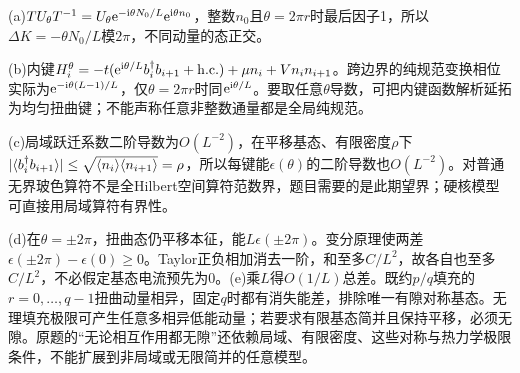 \begin{solution}
(a)$TU_\theta T^{-1}=U_\theta\mathrm e^{-\mathrm i\theta N_0/L}\mathrm e^{\mathrm i\theta n_0}$，整数$n_0$且$\theta=2\pi r$时最后因子1，所以$\Delta K=-\theta N_0/L$模$2\pi$，不同动量的态正交。

(b)内键$H_i^\theta=-t(\mathrm e^{\mathrm i\theta/L}b_i^\dagger b_{i+1}+\mathrm{h.c.})+\mu n_i+Vn_in_{i+1}$。跨边界的纯规范变换相位实际为$\mathrm e^{-\mathrm i\theta(L-1)/L}$，仅$\theta=2\pi r$时同$\mathrm e^{\mathrm i\theta/L}$。要取任意$\theta$导数，可把内键函数解析延拓为均匀扭曲键；不能声称任意非整数通量都是全局纯规范。

(c)局域跃迁系数二阶导数为$O(L^{-2})$，在平移基态、有限密度$\rho$下$|\langle b_i^\dagger b_{i+1}\rangle|\le\sqrt{\langle n_i\rangle\langle n_{i+1}\rangle}=\rho$，所以每键能$\epsilon(\theta)$的二阶导数也$O(L^{-2})$。对普通无界玻色算符不是全Hilbert空间算符范数界，题目需要的是此期望界；硬核模型可直接用局域算符有界性。

(d)在$\theta=\pm2\pi$，扭曲态仍平移本征，能$L\epsilon(\pm2\pi)$。变分原理使两差$\epsilon(\pm2\pi)-\epsilon(0)\ge0$。Taylor正负相加消去一阶，和至多$C/L^2$，故各自也至多$C/L^2$，不必假定基态电流预先为0。(e)乘$L$得$O(1/L)$总差。既约$p/q$填充的$r=0,\ldots,q-1$扭曲动量相异，固定$q$时都有消失能差，排除唯一有隙对称基态。无理填充极限可产生任意多相异低能动量；若要求有限基态简并且保持平移，必须无隙。原题的“无论相互作用都无隙”还依赖局域、有限密度、这些对称与热力学极限条件，不能扩展到非局域或无限简并的任意模型。
\end{solution}

